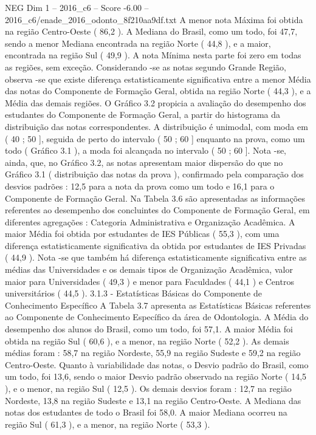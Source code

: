 \begin{textsample}{NEG Dim 1 – 2016\_c6 – Score -6.00 – 2016\_c6/enade\_2016\_odonto\_8f210aa9df.txt}
A menor nota Máxima foi obtida na região Centro-Oeste ( 86,2 ).
A Mediana do Brasil, como um todo, foi 47,7, sendo a menor Mediana encontrada na região Norte ( 44,8 ), e a maior, encontrada na região Sul ( 49,9 ).
A nota Mínima nesta parte foi zero em todas as regiões, sem exceção.
Considerando -se as notas segundo Grande Região, observa -se que existe diferença estatisticamente significativa entre a menor Média das notas do Componente de Formação Geral, obtida na região Norte ( 44,3 ), e a Média das demais regiões.
O Gráfico 3.2 propicia a avaliação do desempenho dos estudantes do Componente de Formação Geral, a partir do histograma da distribuição das notas correspondentes.
A distribuição é unimodal, com moda em ( 40 ; 50 ], seguida de perto do intervalo ( 50 ; 60 ] enquanto na prova, como um todo ( Gráfico 3.1 ), a moda foi alcançada no intervalo ( 50 ; 60 ].
Nota -se, ainda, que, no Gráfico 3.2, as notas apresentam maior dispersão do que no Gráfico 3.1 ( distribuição das notas da prova ), confirmado pela comparação dos desvios padrões : 12,5 para a nota da prova como um todo e 16,1 para o Componente de Formação Geral.
Na Tabela 3.6 são apresentadas as informações referentes ao desempenho dos concluintes do Componente de Formação Geral, em diferentes agregações : Categoria Administrativa e Organização Acadêmica.
A maior Média foi obtida por estudantes de IES Públicas ( 55,3 ), com uma diferença estatisticamente significativa da obtida por estudantes de IES Privadas ( 44,9 ).
Nota -se que também há diferença estatisticamente significativa entre as médias das Universidades e os demais tipos de Organização Acadêmica, valor maior para Universidades ( 49,3 ) e menor para Faculdades ( 44,1 ) e Centros universitários ( 44,5 ). 3.1.3 - Estatísticas Básicas do Componente de Conhecimento Específico A Tabela 3.7 apresenta as Estatísticas Básicas referentes ao Componente de Conhecimento Específico da área de Odontologia.
A Média do desempenho dos alunos do Brasil, como um todo, foi 57,1.
A maior Média foi obtida na região Sul ( 60,6 ), e a menor, na região Norte ( 52,2 ).
As demais médias foram : 58,7 na região Nordeste, 55,9 na região Sudeste e 59,2 na região Centro-Oeste.
Quanto à variabilidade das notas, o Desvio padrão do Brasil, como um todo, foi 13,6, sendo o maior Desvio padrão observado na região Norte ( 14,5 ), e o menor, na região Sul ( 12,5 ).
Os demais desvios foram : 12,7 na região Nordeste, 13,8 na região Sudeste e 13,1 na região Centro-Oeste.
A Mediana das notas dos estudantes de todo o Brasil foi 58,0.
A maior Mediana ocorreu na região Sul ( 61,3 ), e a menor, na região Norte ( 53,3 ).

\end{textsample}
